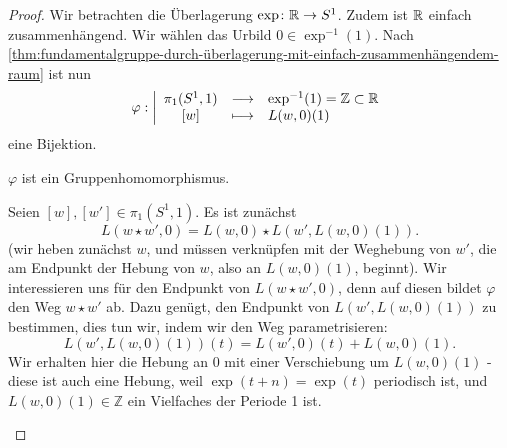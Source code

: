 \begin{proof}
    Wir betrachten die Überlagerung $\exp \colon  \mathbb{R} \to  S^1$. Zudem ist $\mathbb{R}$ einfach zusammenhängend. Wir wählen das Urbild $0\in \exp ^{-1}(1)$. Nach \autoref{thm:fundamentalgruppe-durch-überlagerung-mit-einfach-zusammenhängendem-raum} ist nun
        \begin{equation*}
        \varphi : \left| \begin{array}{c c l} 
            \pi_1(S^1,1) & \longrightarrow & \exp ^{-1}(1) = \mathbb{Z} \subset \mathbb{R} \\
            \left[w\right] & \longmapsto &  L(w,0)(1)
        \end{array} \right.
    \end{equation*}
    eine Bijektion.
    \begin{claim}
        $\varphi $ ist ein Gruppenhomomorphismus.
    \end{claim}
    \begin{subproof}
    Seien $[w],[w'] \in \pi_1(S^1,1)$. Es ist zunächst
    \[
        L(w\star w', 0) = L(w,0) \star L(w',L(w,0)(1))
    .\]
    (wir heben zunächst $w$, und müssen verknüpfen mit der Weghebung von  $w'$, die am Endpunkt der Hebung von  $w$, also an  $L(w,0)(1)$, beginnt). Wir interessieren uns für den Endpunkt von $L(w\star w',0)$, denn auf diesen bildet  $\varphi $ den Weg $w \star w'$ ab. Dazu genügt, den Endpunkt von  $L(w', L(w,0)(1))$ zu bestimmen, dies tun wir, indem wir den Weg parametrisieren:
    \[
        L(w',L(w,0)(1))(t) = L(w',0)(t) + L(w,0)(1)
    .\] 
    Wir erhalten hier die Hebung an $0$ mit einer Verschiebung um  $L(w,0)(1)$ - diese ist auch eine Hebung, weil  $\exp (t+n) = \exp (t)$ periodisch ist, und $L(w,0)(1)\in \mathbb{Z}$ ein Vielfaches der Periode 1 ist.


\end{subproof}
\end{proof}
